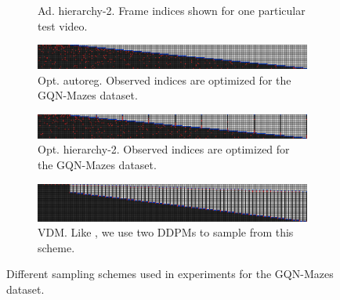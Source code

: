 \begin{figure}[t]
\begin{subfigure}[t]{\textwidth}
        \caption{Ad. hierarchy-2. Frame indices shown for one particular test video.}
    \end{subfigure}
    \begin{subfigure}[t]{\textwidth}
        \includegraphics[width=\textwidth]{figs/fdm/inference-modes/sample_vis_autoreg_optimal-linspace-t-force-nearby_T=300_sampling_10_out_of_20_red_blue_flipped.png}
        \caption{Opt. autoreg. Observed indices are optimized for the GQN-Mazes dataset.} \label{fig:fdm-opt-autoreg}
    \end{subfigure}
    \begin{subfigure}[t]{\textwidth}
        \includegraphics[width=\textwidth]{figs/fdm/inference-modes/sample_vis_hierarchy-2_optimal-linspace-t-force-nearby_T=300_sampling_10_out_of_20_red_blue_flipped.png}
        \caption{Opt. hierarchy-2. Observed indices are optimized for the GQN-Mazes dataset.} \label{fig:fdm-opt-hierarchy-2}
    \end{subfigure}
    \begin{subfigure}[t]{\textwidth}
        \includegraphics[width=\textwidth]{figs/fdm/inference-modes/sample_vis_google_T=300_sampling_None_out_of_None_red_blue_flipped.png}
        \caption{VDM. Like \citet{ho2022video}, we use two DDPMs to sample from this scheme.}
    \end{subfigure}
    \caption{Different sampling schemes used in experiments for the GQN-Mazes dataset.}
    \label{fig:fdm-sampling-schemes}
\end{figure}



